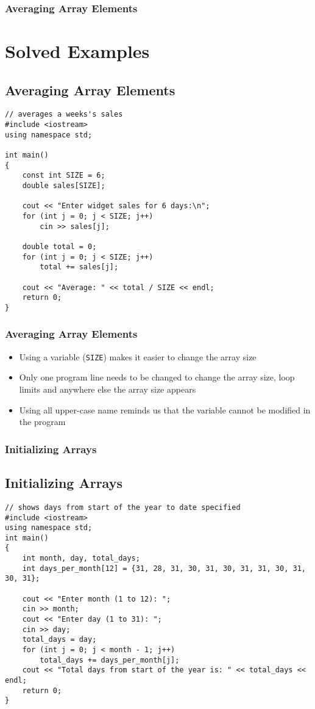 \documentclass{beamer}
\begin{document}
\begin{frame}[fragile]\frametitle{Averaging Array Elements}
    \section{Solved Examples} %
    \label{sec:solved_examples}
    \subsection{Averaging Array Elements} %
    \label{sub:averaging_array_elements}
    \lstset{style=mystyle}
\begin{lstlisting}
// averages a weeks's sales
#include <iostream>
using namespace std;

int main()
{
    const int SIZE = 6;
    double sales[SIZE];

    cout << "Enter widget sales for 6 days:\n";
    for (int j = 0; j < SIZE; j++)
        cin >> sales[j];

    double total = 0;
    for (int j = 0; j < SIZE; j++)
        total += sales[j];

    cout << "Average: " << total / SIZE << endl;
    return 0;
}
\end{lstlisting}
\end{frame}

\begin{frame}\frametitle{Averaging Array Elements}
    \begin{itemize}
        \item Using a variable (\texttt{SIZE}) makes it easier to change the array size
        \item Only one program line needs to be changed to change the array size, loop limits and anywhere else the array size appears
        \item Using all upper-case name reminds us that the variable cannot be modified in the program
    \end{itemize}
\end{frame}

\begin{frame}[fragile]\frametitle{Initializing Arrays}
    \subsection{Initializing Arrays} %
    \label{sub:initializing_arrays}
    \lstset{style=mystyle}
\begin{lstlisting}
// shows days from start of the year to date specified
#include <iostream>
using namespace std;
int main()
{
    int month, day, total_days;
    int days_per_month[12] = {31, 28, 31, 30, 31, 30, 31, 31, 30, 31, 30, 31};

    cout << "Enter month (1 to 12): ";
    cin >> month;
    cout << "Enter day (1 to 31): ";
    cin >> day;
    total_days = day;
    for (int j = 0; j < month - 1; j++)
        total_days += days_per_month[j];
    cout << "Total days from start of the year is: " << total_days << endl;
    return 0;
}
\end{lstlisting}
\end{frame}
\end{document}
